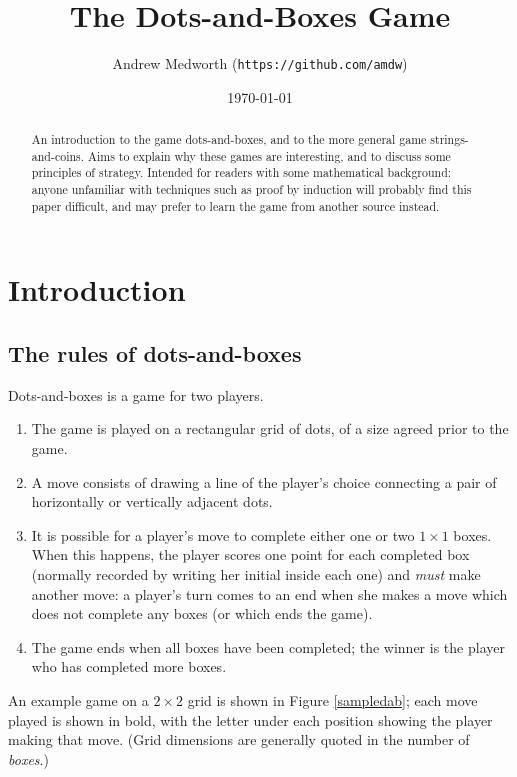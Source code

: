 \documentclass[a4paper,twocolumn]{article}
\begin{document}
\title{The Dots-and-Boxes Game}
\author{Andrew Medworth (\texttt{https://github.com/amdw})}
\date{\today}
\maketitle

\begin{abstract}
  An introduction to the game dots-and-boxes, and to the more general
  game strings-and-coins. Aims to explain why these games are
  interesting, and to discuss some principles of strategy. Intended
  for readers with some mathematical background: anyone unfamiliar
  with techniques such as proof by induction will probably find this
  paper difficult, and may prefer to learn the game from another
  source instead.
\end{abstract}

\tableofcontents

\section{Introduction}

\subsection{The rules of dots-and-boxes}

Dots-and-boxes is a game for two players.

\begin{enumerate}
  \item The game is played on a rectangular grid of dots, of a size
    agreed prior to the game.
  \item A move consists of drawing a line of the player's choice
    connecting a pair of horizontally or vertically adjacent dots.
  \item It is possible for a player's move to complete either one or
    two $1 \times 1$ boxes. When this happens, the player scores one
    point for each completed box (normally recorded by writing her
    initial inside each one) and \emph{must} make another move: a
    player's turn comes to an end when she makes a move which does not
    complete any boxes (or which ends the game).
  \item The game ends when all boxes have been completed; the winner
    is the player who has completed more boxes.
\end{enumerate}

An example game on a $2 \times 2$ grid is shown in Figure
\ref{sampledab}; each move played is shown in bold, with the letter
under each position showing the player making that move. (Grid
dimensions are generally quoted in the number of \emph{boxes}.)
\end{document}
